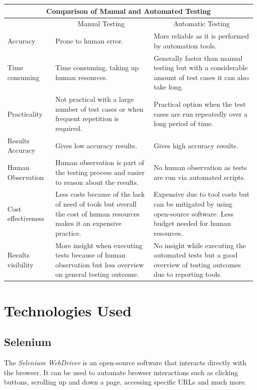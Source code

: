 \begin{center}
\begin{longtable}{ |p{3.7cm}|p{4.6cm}|p{4.6cm}| }
 \hline
 	\multicolumn{3}{|c|}{Comparison of Manual and Automated Testing} \\
 \hline
 	& \multicolumn{1}{|c|}{Manual Testing} & \multicolumn{1}{|c|}{Automatic Testing} \\
 \hline
 	Accuracy & Prone to human error. & More reliable as it is performed by automation tools.\\
 \hline
    Time consuming & Time consuming, taking up human resources. & Generally faster than manual testing but with a considerable amount of test cases it can also take long.\\
 \hline
    Practicality & Not practical with a large number of test cases or when frequent repetition is required. & Practical option when the test cases are run repeatedly over a long period of time.\\
 \hline
    Results Accuracy & Gives low accuracy results. & Gives high accuracy results.\\
 \hline
    Human Observation & Human observation is part of the testing process and easier to reason about the results. & No human observation as tests are run via automated scripts.\\
 \hline
    Cost effectiveness & Less costs because of the lack of need of tools but overall the cost of human resources makes it an expensive practice. & Expensive due to tool costs but can be mitigated by using open-source software. Less budget needed for human resources.\\
 \hline
    Results visibility & More insight when executing tests because of human observation but less overview on general testing outcome. & No insight while executing the automated tests but a good overview of testing outcomes due to reporting tools.\\
 \hline
\end{longtable}
\label{tab:manual-vs-automatic}
\end{center}

\section{Technologies Used}
\label{sec:technologies-used}

\subsection{Selenium}
\label{subsec:selenium}
The \textit{Selenium WebDriver} is an open-source software that interacts directly with the browser. It can be used to automate browser interactions such as clicking buttons, scrolling up and down a page, accessing specific URLs and much more.
\\

